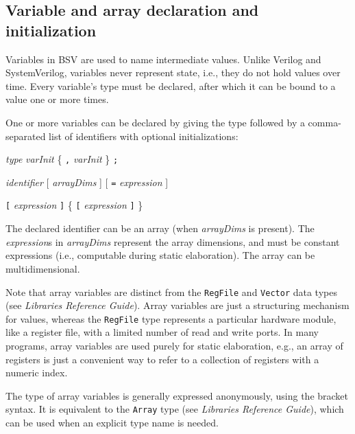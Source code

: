 \documentclass[twoside,letterpaper]{article}
\newcommand{\hm}{\hspace*{1em}}
\newcommand{\LibRefGuide}{\emph{Libraries Reference Guide}}
\newcommand{\BSV}{BSV}
\newcommand{\SV}{SystemVerilog}
\newcommand{\V}{Verilog}
\newcommand{\te}[1]{\texttt{#1}}
\newcommand{\nterm}[1]{\emph{#1}}
\newcommand{\term}[1]{\texttt{#1}}
\newcommand{\many}[1]{\{ #1 \}}
\newcommand{\opt}[1]{[ #1 ]}
\newcommand{\gram}[2]{    \hm\makebox[10em][l]{\it #1}\makebox[1.5em][l]{::=}    #2}
\begin{document}

\subsection{Variable and array declaration and initialization}

\label{sec-var-decl-initialization}

Variables in {\BSV} are used to name intermediate values.  Unlike {\V}
and {\SV}, variables never represent state, i.e., they do not hold
values over time.  Every variable's type must be declared, after which
it can be bound to a value one or more times.

One or more variables can be declared by giving the type followed by a
comma-separated list of identifiers with optional initializations:

\gram{varDecl}{ \nterm{type} \nterm{varInit} \many{ \term{,} \nterm{varInit} } \term{;} }

\gram{varInit}{ \nterm{identifier} \opt{ \nterm{arrayDims} }
                                   \opt{ \term{=} \nterm{expression} } }

\gram{arrayDims}{ \term{[} \nterm{expression} \term{]}
                  \many{ \term{[} \nterm{expression} \term{]} } }

The declared identifier can be an array (when \nterm{arrayDims} is
present).  The \nterm{expression}s in \nterm{arrayDims} represent the
array dimensions, and must be constant expressions (i.e., computable
during static elaboration).  The array can be multidimensional.

Note that array variables are distinct from the \texttt{RegFile} and
\te{Vector} data types (see \LibRefGuide).  Array variables are just a
structuring mechanism for values, whereas the \texttt{RegFile} type
represents a particular hardware module, like a register file, with a
limited number of read and write ports.  In many programs, array
variables are used purely for static elaboration, e.g., an array of
registers is just a convenient way to refer to a collection of
registers with a numeric index.

 The type of array variables is generally
expressed anonymously, using the bracket syntax.  It is equivalent to
the \te{Array} type (see \LibRefGuide), which can be used when an
explicit type name is needed.
\end{document}
